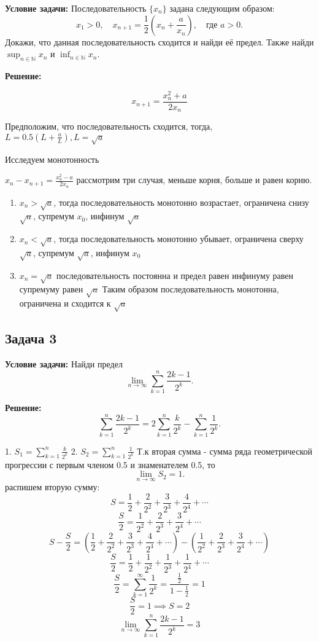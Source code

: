 \documentclass[a4paper,12pt]{article}
\begin{document}
\textbf{Условие задачи:}
Последовательность $\{x_n\}$ задана следующим образом:
\[
x_1 > 0, \quad x_{n+1} = \frac{1}{2} \left( x_n + \frac{a}{x_n} \right), \quad \text{где } a > 0.
\]
Докажи, что данная последовательность сходится и найди её предел. Также найди $\sup_{n \in \mathbb{N}} x_n$ и $\inf_{n \in \mathbb{N}} x_n$.

\textbf{Решение:}

\[
x_{n+1}=\frac{x_n^2+a}{2x_n}
\]

Предположим, что последовательность сходится, тогда, $L=0.5(L+\frac{a}{L}), L=\sqrt{a}$

Исследуем монотонность

$x_{n}-x_{n+1}=\frac{x_n^2-a}{2x_n}$ рассмотрим три случая, меньше корня, больше и равен корню.
\begin{enumerate}
    \item $x_n > \sqrt{a}$, тогда последовательность монотонно возрастает, ограничена снизу $\sqrt{a}$, супремум $x_0$, инфинум $\sqrt{a}$
    \item $x_n < \sqrt{a}$, тогда последовательность монотонно убывает, ограничена сверху $\sqrt{a}$, супремум $\sqrt{a}$, инфинум $x_0$
    \item $x_n = \sqrt{a}$ последовательность постоянна и предел равен инфинуму равен супремуму равен $\sqrt{a}$
    Таким образом последовательность монотонна, ограничена и сходится к $\sqrt{a}$
\end{enumerate}


\vspace{1cm}

\subsection{Задача 3}


\textbf{Условие задачи:}
Найди предел
\[
\lim_{n \to \infty} \sum_{k=1}^{n} \frac{2k - 1}{2^k}.
\]

\textbf{Решение:}
\[
\sum_{k=1}^{n} \frac{2k - 1}{2^k} = 2 \sum_{k=1}^{n} \frac{k}{2^k} - \sum_{k=1}^{n} \frac{1}{2^k}.
\]

1. \( S_1 = \sum_{k=1}^{n} \frac{k}{2^k} \)
2. \( S_2 = \sum_{k=1}^{n} \frac{1}{2^k} \)
Т.к вторая сумма - сумма ряда геометрической прогрессии с первым членом 0.5 и знаменателем 0.5, то
\[
\lim_{n \to \infty} S_2 = 1.
\]
распишем вторую сумму: 
\[
S = \frac{1}{2} + \frac{2}{2^2} + \frac{3}{2^3} + \frac{4}{2^4} + \cdots
\]
\[
\frac{S}{2} = \frac{1}{2^2} + \frac{2}{2^3} + \frac{3}{2^4} + \cdots
\]
\[
S - \frac{S}{2} = \left( \frac{1}{2} + \frac{2}{2^2} + \frac{3}{2^3} + \frac{4}{2^4} + \cdots \right) - \left( \frac{1}{2^2} + \frac{2}{2^3} + \frac{3}{2^4} + \cdots \right)
\]
\[
\frac{S}{2} = \frac{1}{2} + \frac{1}{2^2} + \frac{1}{2^3} + \frac{1}{2^4} + \cdots
\]
\[
\frac{S}{2} = \sum_{k=1}^{\infty} \frac{1}{2^k} = \frac{\frac{1}{2}}{1 - \frac{1}{2}} = 1
\]
\[
\frac{S}{2} = 1 \implies S = 2
\]
\[
\lim_{n \to \infty} \sum_{k=1}^{n} \frac{2k - 1}{2^k} = 3
\]
\end{document}

